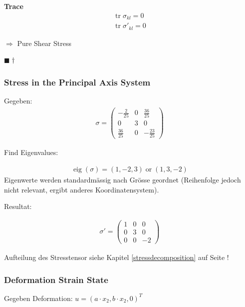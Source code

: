 \documentclass[a4paper, 10pt]{scrartcl}
\newcommand{\qed}{\begin{flushright}
		$\blacksquare \dagger$ \end{flushright}}
\begin{document}
\textbf{Trace}\\

\begin{align}
	\operatorname{tr}\sigma_{kl}=0 \\
	\operatorname{tr}\sigma'_{kl}=0 
\end{align}

$\Rightarrow$ Pure Shear Stress
\qed
\subsubsection{Stress in the Principal Axis System}
Gegeben:
\begin{align}
	\sigma=\begin{pmatrix}
		-\frac{2}{25} & 0 & \frac{36}{25} \\
		0 & 3 & 0 \\
		\frac{36}{25}& 0 & -\frac{23}{25}
	\end{pmatrix}
\end{align}

Find Eigenvalues:

\begin{align}
	\operatorname{eig}(\sigma)=\left(1,-2, 3\right) \operatorname{or}
	\left(1,3,-2\right)
\end{align}
Eigenwerte werden standardmässig nach Grösse geordnet (Reihenfolge jedoch nicht
relevant, ergibt anderes Koordinatensystem).


Resultat:

\begin{align}
	\sigma'=\begin{pmatrix}
		1 & 0 & 0 \\
		0 & 3 & 0 \\
		0 & 0 & -2
	\end{pmatrix}
\end{align}

Aufteilung des Stresstensor siehe Kapitel \ref{stressdecomposition} auf Seite
\pageref{stressdecomposition}!

\subsubsection{Deformation Strain State}\label{9.3} %
Gegeben Deformation: $u = (a \cdot x_2, b \cdot x_2, 0)^T$
\end{document}
